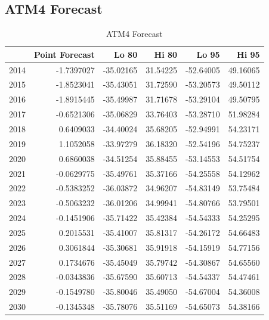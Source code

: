 \documentclass[openany]{book}
\begin{document}
\hypertarget{Part-A-FC4}{%
\subsection*{ATM4 Forecast}\label{Part-A-FC4}}

\begin{table}[H]

\caption{\label{tab:unnamed-chunk-10}ATM4 Forecast}
\centering
\begin{tabular}{l|r|r|r|r|r}
\hline
\textbf{ } & \textbf{Point Forecast} & \textbf{Lo 80} & \textbf{Hi 80} & \textbf{Lo 95} & \textbf{Hi 95}\\
\hline
\rowcolor{gray!6}  2014 & -1.7397027 & -35.02165 & 31.54225 & -52.64005 & 49.16065\\
\hline
2015 & -1.8523041 & -35.43051 & 31.72590 & -53.20573 & 49.50112\\
\hline
\rowcolor{gray!6}  2016 & -1.8915445 & -35.49987 & 31.71678 & -53.29104 & 49.50795\\
\hline
2017 & -0.6521306 & -35.06829 & 33.76403 & -53.28710 & 51.98284\\
\hline
\rowcolor{gray!6}  2018 & 0.6409033 & -34.40024 & 35.68205 & -52.94991 & 54.23171\\
\hline
2019 & 1.1052058 & -33.97279 & 36.18320 & -52.54196 & 54.75237\\
\hline
\rowcolor{gray!6}  2020 & 0.6860038 & -34.51254 & 35.88455 & -53.14553 & 54.51754\\
\hline
2021 & -0.0629775 & -35.49761 & 35.37166 & -54.25558 & 54.12962\\
\hline
\rowcolor{gray!6}  2022 & -0.5383252 & -36.03872 & 34.96207 & -54.83149 & 53.75484\\
\hline
2023 & -0.5063232 & -36.01206 & 34.99941 & -54.80766 & 53.79501\\
\hline
\rowcolor{gray!6}  2024 & -0.1451906 & -35.71422 & 35.42384 & -54.54333 & 54.25295\\
\hline
2025 & 0.2015531 & -35.41007 & 35.81317 & -54.26172 & 54.66483\\
\hline
\rowcolor{gray!6}  2026 & 0.3061844 & -35.30681 & 35.91918 & -54.15919 & 54.77156\\
\hline
2027 & 0.1734676 & -35.45049 & 35.79742 & -54.30867 & 54.65560\\
\hline
\rowcolor{gray!6}  2028 & -0.0343836 & -35.67590 & 35.60713 & -54.54337 & 54.47461\\
\hline
2029 & -0.1549780 & -35.80046 & 35.49050 & -54.67004 & 54.36008\\
\hline
\rowcolor{gray!6}  2030 & -0.1345348 & -35.78076 & 35.51169 & -54.65073 & 54.38166\\
\hline
\end{tabular}
\end{table}
\end{document}
